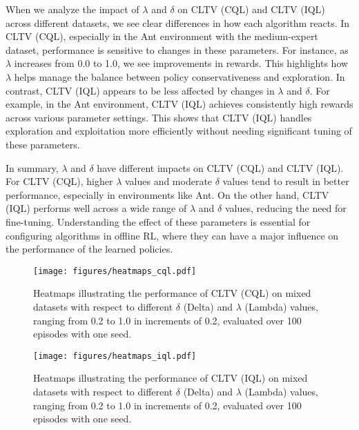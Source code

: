 When we analyze the impact of \(\lambda\) and \(\delta\) on CLTV (CQL) and CLTV (IQL) across different datasets, we see clear differences in how each algorithm reacts. In CLTV (CQL), especially in the Ant environment with the medium-expert dataset, performance is sensitive to changes in these parameters. For instance, as \(\lambda\) increases from 0.0 to 1.0, we see improvements in rewards. This highlights how \(\lambda\) helps manage the balance between policy conservativeness and exploration. In contrast, CLTV (IQL) appears to be less affected by changes in \(\lambda\) and \(\delta\). For example, in the Ant environment, CLTV (IQL) achieves consistently high rewards across various parameter settings. This shows that CLTV (IQL) handles exploration and exploitation more efficiently without needing significant tuning of these parameters. 

In summary, \(\lambda\) and \(\delta\) have different impacts on CLTV (CQL) and CLTV (IQL). For CLTV (CQL), higher \(\lambda\) values and moderate \(\delta\) values tend to result in better performance, especially in environments like Ant. On the other hand, CLTV (IQL) performs well across a wide range of \(\lambda\) and \(\delta\) values, reducing the need for fine-tuning. Understanding the effect of these parameters is essential for configuring algorithms in offline RL, where they can have a major influence on the performance of the learned policies.


\begin{figure*}[!ht]
\center
\texttt{[image: figures/heatmaps\_cql.pdf]}
\caption{{Heatmaps illustrating the performance of CLTV (CQL) on mixed datasets with respect to different $\delta$ (Delta) and $\lambda$ (Lambda) values, ranging from 0.2 to 1.0 in increments of 0.2, evaluated over 100 episodes with one seed.}}
\label{fig-deltalambda-cql}
\end{figure*}



\begin{figure*}[!ht]
\center
\texttt{[image: figures/heatmaps\_iql.pdf]}
\caption{{Heatmaps illustrating the performance of CLTV (IQL) on mixed datasets with respect to different $\delta$ (Delta) and $\lambda$ (Lambda) values, ranging from 0.2 to 1.0 in increments of 0.2, evaluated over 100 episodes with one seed.}}

\label{fig-deltalambda-iql}
\end{figure*}




